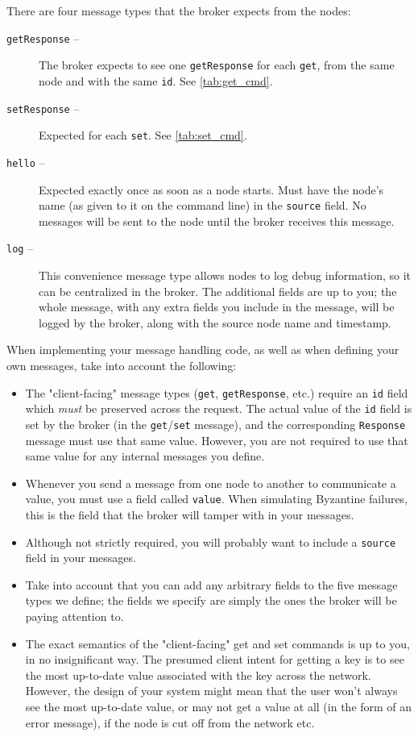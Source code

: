 \documentclass[12pt]{article}
\begin{document}
There are four message types that the broker expects from the nodes:

\begin{description}
\item[{\tt getResponse} --] The broker expects to see one {\tt getResponse} for each {\tt get}, from the same node and with the same {\tt id}. See \cref{tab:get_cmd}.
\item[{\tt setResponse} --] Expected for each {\tt set}. See \cref{tab:set_cmd}.
\item[{\tt hello} --] Expected exactly once as soon as a node starts. Must have the node's name (as given to it on the command line) in the {\tt source} field. No messages will be sent to the node until the broker receives this message.
\item[{\tt log} --] This convenience message type allows nodes to log debug information, so it can be centralized in the broker. The additional fields are up to you; the whole message, with any extra fields you include in the message, will be logged by the broker, along with the source node name and timestamp.
\end{description}

When implementing your message handling code, as well as when defining your own messages, take into account the following:

\begin{itemize}
\item The "client-facing" message types ({\tt get}, {\tt getResponse}, etc.) require an {\tt id} field which \emph{must} be preserved across the request. The actual value of the  {\tt id} field is set by the broker (in the {\tt get}/{\tt set} message), and the corresponding {\tt Response} message must use that same value. However, you are not required to use that same value for any internal messages you define. 

\item Whenever you send a message from one node to another to communicate a value, you must use a field called \texttt{value}. When simulating Byzantine failures, this is the field that the broker will tamper with in your messages.

\item Although not strictly required, you will probably want to include a {\tt source} field in your messages.

\item Take into account that you can add any arbitrary fields to the five message types we define; the fields we specify are simply the ones the broker will be paying attention to. 

\item The exact semantics of the "client-facing" get and set commands is up to you, in no insignificant way. The presumed client intent for getting a key is to see the most up-to-date value associated with the key across the network. However, the design of your system might mean that the user won't always see the most up-to-date value, or may not get a value at all (in the form of an error message), if the node is cut off from the network etc.
\end{itemize}
\end{document}
